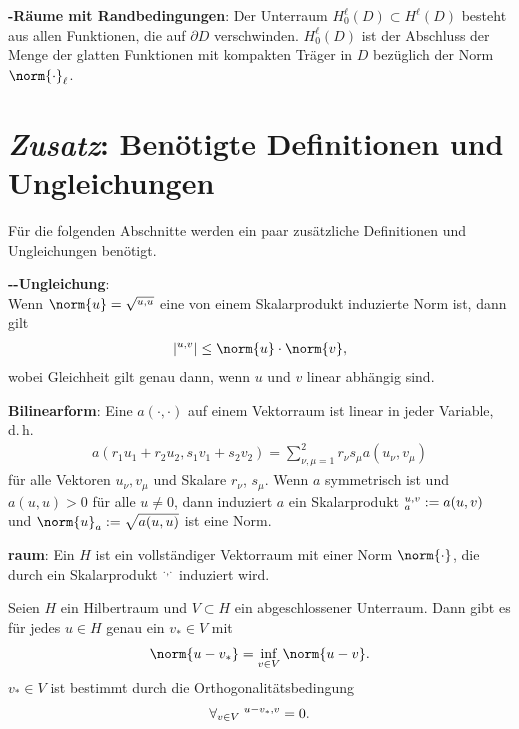 \linie

\textbf{-Räume mit Randbedingungen}:
Der Unterraum $H_0^\ell(D) \subset H^\ell(D)$ besteht aus allen Funktionen, die auf $\partial D$
verschwinden.
$H_0^\ell(D)$ ist der Abschluss der Menge der glatten Funktionen mit kompakten Träger in $D$
bezüglich der Norm $\norm{\cdot}_\ell$.

\section{%
    \emph{Zusatz}:
    Benötigte Definitionen und Ungleichungen%
}

Für die folgenden Abschnitte werden ein paar zusätzliche Definitionen und Ungleichungen benötigt.

\linie

\textbf{--Ungleichung}:\\
Wenn $\norm{u} = \sqrt{\sp{u, u}}$ eine von einem Skalarprodukt induzierte Norm ist,
dann gilt
\begin{align*}
    |\sp{u, v}| \le \norm{u} \cdot \norm{v},
\end{align*}
wobei Gleichheit gilt genau dann, wenn $u$ und $v$ linear abhängig sind.

\linie

\textbf{Bilinearform}:
Eine  $a(\cdot, \cdot)$ auf einem Vektorraum ist linear in
jeder Variable, d.\,h.
\begin{align*}
    a(r_1 u_1 + r_2 u_2, s_1 v_1 + s_2 v_2) = \sum_{\nu,\mu=1}^2 r_\nu s_\mu a(u_\nu, v_\mu)
\end{align*}
für alle Vektoren $u_\nu, v_\mu$ und Skalare $r_\nu$, $s_\mu$.
Wenn $a$ symmetrisch ist und $a(u, u) > 0$ für alle $u \not= 0$,
dann induziert $a$ ein Skalarprodukt $\sp{u, v}_a := a(u, v)$ und
$\norm{u}_a := \sqrt{a(u, u)}$ ist eine Norm.

\linie

\textbf{raum}:
Ein  $H$ ist ein vollständiger Vektorraum mit einer Norm
$\norm{\cdot}$, die durch ein Skalarprodukt $\sp{\cdot, \cdot}$ induziert wird.

Seien $H$ ein Hilbertraum und $V \subset H$ ein abgeschlossener Unterraum.
Dann gibt es für jedes $u \in H$ genau ein $v_\ast \in V$ mit
\begin{align*}
    \norm{u - v_\ast} = \inf_{v \in V} \norm{u - v}.
\end{align*}
$v_\ast \in V$ ist bestimmt durch die Orthogonalitätsbedingung
\begin{align*}
    \forall_{v \in V}\; \sp{u - v_\ast, v} = 0.
\end{align*}

